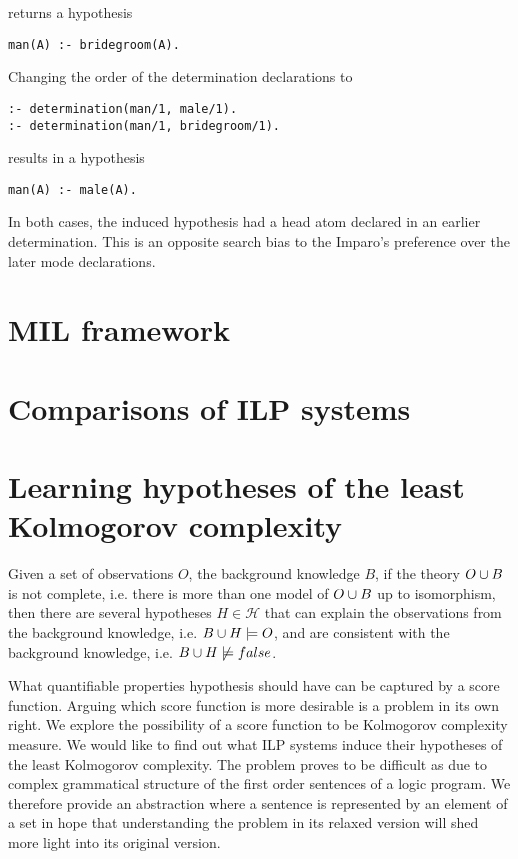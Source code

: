 returns a hypothesis
\begin{lstlisting}
man(A) :- bridegroom(A).
\end{lstlisting}

Changing the order of the determination declarations to
\begin{lstlisting}
:- determination(man/1, male/1).
:- determination(man/1, bridegroom/1).
\end{lstlisting}
results in a hypothesis
\begin{lstlisting}
man(A) :- male(A).
\end{lstlisting}
In both cases, the induced hypothesis had a head atom declared in an earlier determination. This is an opposite search bias to the Imparo's preference over the later mode declarations.

\chapter{MIL framework}

\chapter{Comparisons of ILP systems}

\chapter{Learning hypotheses of the least Kolmogorov complexity}

Given a set of observations $O$, the background knowledge $B$, if the theory $O \cup B$ is not complete, i.e. there is more than one model of $O \cup B$ up to isomorphism, then there are several hypotheses $H \in \mathcal{H}$ that can explain the observations from the background knowledge, i.e. $B \cup H \models O$, and are consistent with the background knowledge, i.e. $B \cup H \not\models false$.

What quantifiable properties hypothesis should have can be captured by a score function. Arguing which score function is more desirable is a problem in its own right. We explore the possibility of a score function to be Kolmogorov complexity measure. We would like to find out what ILP systems induce their hypotheses of the least Kolmogorov complexity. The problem proves to be difficult as due to complex grammatical structure of the first order sentences of a logic program. We therefore provide an abstraction where a sentence is represented by an element of a set in hope that understanding the problem in its relaxed version will shed more light into its original version.

